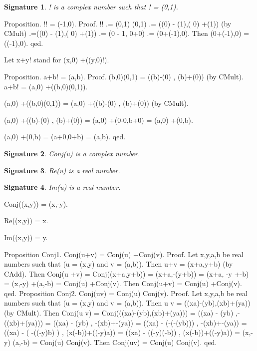\documentclass{article}
\newenvironment{forthel}{\begin{leftbar}}{\end{leftbar}}
\newtheorem{axiom}{\begin{axiom} }
\newtheorem{signature}{Signature}
\newcommand{\cmul}{\cdot}
\newcommand{\rmul}{\cdot}
\newcommand{\cadd}{+}
\newcommand{\radd}{+}
\begin{document}
\begin{forthel}
\begin{signature} ! is a complex number such that ! = (0,1).
\end{signature}

Proposition. !\cmul ! = (-1,0).
Proof. 	!\cmul ! .= (0,1) \cmul  (0,1) 
		.= ((0\rmul 0) - (1\rmul 1),( 0\rmul 1) \radd  (1\rmul 0)) (by CMult)
		.=((0\rmul 0) - (1\rmul 1),( 0\rmul 1) \radd  (1\rmul 0)) 
		.= (0 - 1, 0\radd 0) 
		.= (0\radd (-1),0).
		Then (0\radd (-1),0) = ((-1),0). 
qed.

Let x\radd y! stand for (x,0) \cadd  ((y,0)\cmul !).


Proposition. a\radd b! = (a,b).
Proof. 	(b,0)\cmul (0,1) = ((b\rmul 0)-(0\rmul 1) , (b\rmul 1)\radd (0\rmul 0)) (by CMult).
		a\radd b! = (a,0) \cadd  ((b,0)\cmul (0,1)). 
		
		(a,0) \cadd  ((b,0)\cmul (0,1))
		= (a,0) \cadd  ((b\rmul 0)-(0\rmul 1) , (b\rmul 1)\radd (0\rmul 0)) (by CMult).

		(a,0) \cadd  ((b\rmul 0)-(0\rmul 1) , (b\rmul 1)\radd (0\rmul 0))
		= (a,0) \cadd  (0-0,b\radd 0) 
		= (a,0) \cadd  (0,b).
		
		(a,0) \cadd  (0,b)
		= (a\radd 0,0\radd b) 
		= (a,b).
qed.


\begin{signature} Conj(u) is a complex number.
\end{signature}
\begin{signature} Re(u) is a real number.
\end{signature}
\begin{signature} Im(u) is a real number.
\end{signature}
\begin{axiom} Conj((x,y)) = (x,-y).
\end{axiom}
\begin{axiom} Re((x,y)) = x.
\end{axiom}
\begin{axiom} Im((x,y)) = y.
\end{axiom}

Proposition Conj1. Conj(u\cadd v) = Conj(u) \cadd  Conj(v).
Proof. 	Let x,y,a,b be real numbers such that (u = (x,y) and v = (a,b)).
		Then u\cadd v = (x\radd a,y\radd b) (by CAdd).
		Then Conj(u \cadd  v) = Conj((x\radd a,y\radd b)) = (x\radd a,-(y\radd b)) = (x\radd a, -y \radd  -b) = (x,-y) \cadd  (a,-b) = Conj(u) \cadd  Conj(v).
		Then Conj(u\cadd v) = Conj(u) \cadd  Conj(v).
qed.		
Proposition Conj2. Conj(u\cmul v) = Conj(u) \cmul  Conj(v).
Proof. 	Let x,y,a,b be real numbers such that (u = (x,y) and v = (a,b)).
		Then u \cmul  v = ((x\rmul a)-(y\rmul b),(x\rmul b)\radd (y\rmul a)) (by CMult).
		Then Conj(u \cmul  v) 	= Conj(((x\rmul a)-(y\rmul b),(x\rmul b)\radd (y\rmul a))) 
							= ((x\rmul a) - (y\rmul b)       ,-((x\rmul b)\radd (y\rmul a))) 
							= ((x\rmul a) - (y\rmul b)       , -(x\rmul b)\radd  -(y\rmul a))
							= ((x\rmul a) - (-(-(y\rmul b))) , -(x\rmul b)\radd  -(y\rmul a))
							= ((x\rmul a) - ( -((-y)\rmul b) ) , (x\rmul (-b))\radd  ((-y)\rmul a))
							= ((x\rmul a) - ((-y)\rmul (-b)) , (x\rmul (-b))\radd  ((-y)\rmul a))
							= (x,-y) \cmul  (a,-b)
							= Conj(u) \cmul  Conj(v). 
		Then Conj(u\cmul v) = Conj(u) \cmul  Conj(v).
qed.


\end{forthel}
\end{document}
